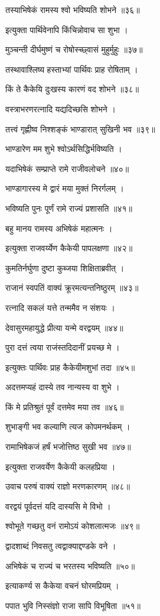 तस्याभिषेकं रामस्य श्वो भविष्यति शोभने ॥३६॥

इत्युक्ता पार्थिवेनापि किंचिन्नोवाच सा शुभा ।

मुञ्चन्ती दीर्घमुष्णं च रोषोस्च्छ्वासं मुहुर्मुहुः ॥३७॥

तस्थावाश्लिष्य हस्ताभ्यां पार्थिवः प्राह रोषिताम् ।

किं ते कैकेयि दुःखस्य कारणं वद शोभने ॥३८॥

वस्त्राभरणरत्नादि यद्यदिच्छसि शोभने ।

तत्त्वं गृह्णीष्व निश्शङ्कं भाण्डारात् सुखिनी भव ॥३९॥

भाण्डारेण मम शुभे श्वोऽर्थसिद्धिर्भविष्यति ।

यदाभिषेकं सम्प्राप्ते रामे राजीवलोचने ॥४०॥

भाण्डागारस्य मे द्वारं मया मुक्तं निरर्गलम् ।

भविष्यति पुनः पूर्णं रामे राज्यं प्रशासति ॥४१॥

बहु मानय रामस्य अभिषेकं महात्मनः ।

इत्युक्ता राजवर्य्येण कैकेयी पापलक्षणा ॥४२॥

कुमतिर्नर्घुणा दुष्टा कुब्जया शिक्षिताब्रवीत् ।

राजानं स्वपतिं वाक्यं क्रूरमत्यन्तनिष्ठुरम् ॥४३॥

रत्नादि सकलं यत्ते तन्ममैव न संशयः ।

देवासुरमहायुद्धे प्रीत्या यन्मे वरद्वयम् ॥४४॥

पुरा दत्तं त्वया राजंस्तदिदानीं प्रयच्छ मे ।

इत्युक्तः पार्थिवः प्राह कैकेयीमशुभां तदा ॥४५॥

अदत्तमप्यहं दास्ये तव नान्यस्य वा शुभे ।

किं मे प्रतिश्रुतं पूर्वं दत्तमेव मया तव ॥४६॥

शुभाङ्गी भव कल्याणि त्यज कोपमनर्थकम् ।

रामाभिषेकजं हर्षं भजोत्तिष्ठ सुखी भव ॥४७॥

इत्युक्ता राजवर्येण कैकेयी कलहप्रिया ।

उवाच परुषं वाक्यं राज्ञो मरणकारणम् ॥४८॥

वरद्वयं पूर्वदत्तं यदि दास्यसि मे विभो ।

श्वोभूते गच्छतु वनं रामोऽयं कोशलात्मजः ॥४९॥

द्वादशाब्दं निवसतु त्वद्वाक्याद्दण्डके वने ।

अभिषेकं च राज्यं च भरतस्य भविष्यति ॥५०॥

इत्याकर्ण्य स कैकेया वचनं घोरमप्रियम् ।

पपात भुवि निस्संज्ञो राजा सापि विभूषिता ॥५१॥

